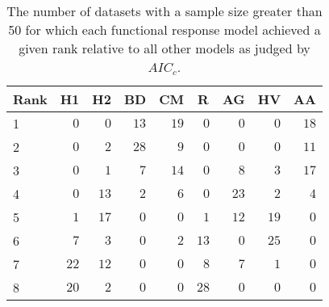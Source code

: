 \begin{table}[!tbp]
\caption{The number of datasets with a sample size greater than 50 for which each functional response model achieved a given rank relative to all other models as judged by $AIC_c$.\label{table:AICc_rankings}} 
\begin{center}
\begin{tabular}{lrrrrrrrr}
\hline\hline
\multicolumn{1}{l}{Rank}&\multicolumn{1}{c}{H1}&\multicolumn{1}{c}{H2}&\multicolumn{1}{c}{BD}&\multicolumn{1}{c}{CM}&\multicolumn{1}{c}{R}&\multicolumn{1}{c}{AG}&\multicolumn{1}{c}{HV}&\multicolumn{1}{c}{AA}\tabularnewline
\hline
1&$ 0$&$ 0$&$13$&$19$&$ 0$&$ 0$&$ 0$&$18$\tabularnewline
2&$ 0$&$ 2$&$28$&$ 9$&$ 0$&$ 0$&$ 0$&$11$\tabularnewline
3&$ 0$&$ 1$&$ 7$&$14$&$ 0$&$ 8$&$ 3$&$17$\tabularnewline
4&$ 0$&$13$&$ 2$&$ 6$&$ 0$&$23$&$ 2$&$ 4$\tabularnewline
5&$ 1$&$17$&$ 0$&$ 0$&$ 1$&$12$&$19$&$ 0$\tabularnewline
6&$ 7$&$ 3$&$ 0$&$ 2$&$13$&$ 0$&$25$&$ 0$\tabularnewline
7&$22$&$12$&$ 0$&$ 0$&$ 8$&$ 7$&$ 1$&$ 0$\tabularnewline
8&$20$&$ 2$&$ 0$&$ 0$&$28$&$ 0$&$ 0$&$ 0$\tabularnewline
\hline
\end{tabular}\end{center}
\end{table}

